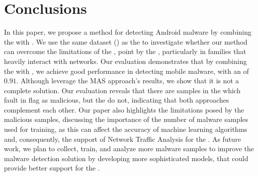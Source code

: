 \section{Conclusions}\label{sec:conclusions}

In this paper, we propose a method for detecting Android malware by combining the \mas with \net. We use the same dataset (\cds) as the \fhc to investigate whether our method can overcome the limitations of the \mas, point by the \fhc, particularly in families that heavily interact with networks. Our evaluation demonstrates that by combining the \mas with \net, we achieve good performance in detecting mobile malware, with an \fone of $0.91$. Although \net leverage the MAS approach's results, we show that it is not a complete solution. Our evaluation reveals that there are samples in the \cds which \net fault in flag as malicious, but the \mas do not, indicating that both approaches complement each other. Our paper also highlights the limitations posed by the malicious samples, discussing the importance of the number of malware samples used for training, as this can affect the accuracy of machine learning algorithms and, consequently, the support of Network Traffic Analysis for the \mas. As future work, we plan to collect, train, and analyze more malware samples to improve the malware detection solution by developing more sophisticated models, that could provide better support for the \mas.